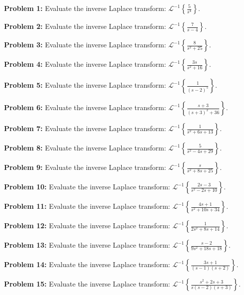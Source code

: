 \documentclass[11pt, letterpaper]{article}
\theoremstyle{definition}
\theoremstyle{remark}
\begin{document}
\textbf{Problem 1:} Evaluate the inverse Laplace transform: $\displaystyle \mathcal{L}^{-1} \left\{ \frac{5}{s^4} \right\}$.

\textbf{Problem 2:} Evaluate the inverse Laplace transform: $\displaystyle \mathcal{L}^{-1} \left\{ \frac{7}{s-4} \right\}$.

\textbf{Problem 3:} Evaluate the inverse Laplace transform: $\displaystyle \mathcal{L}^{-1} \left\{ \frac{8}{s^2 + 25} \right\}$.

\textbf{Problem 4:} Evaluate the inverse Laplace transform: $\displaystyle \mathcal{L}^{-1} \left\{ \frac{3s}{s^2 + 16} \right\}$.

\textbf{Problem 5:} Evaluate the inverse Laplace transform: $\displaystyle \mathcal{L}^{-1} \left\{ \frac{1}{(s-2)^5} \right\}$.

\textbf{Problem 6:} Evaluate the inverse Laplace transform: $\displaystyle \mathcal{L}^{-1} \left\{ \frac{s+3}{(s+3)^2 + 36} \right\}$.

\textbf{Problem 7:} Evaluate the inverse Laplace transform: $\displaystyle \mathcal{L}^{-1} \left\{ \frac{1}{s^2 + 6s + 13} \right\}$.

\textbf{Problem 8:} Evaluate the inverse Laplace transform: $\displaystyle \mathcal{L}^{-1} \left\{ \frac{5}{s^2 - 4s + 29} \right\}$.

\textbf{Problem 9:} Evaluate the inverse Laplace transform: $\displaystyle \mathcal{L}^{-1} \left\{ \frac{s}{s^2 + 8s + 25} \right\}$.

\textbf{Problem 10:} Evaluate the inverse Laplace transform: $\displaystyle \mathcal{L}^{-1} \left\{ \frac{2s - 3}{s^2 - 2s + 10} \right\}$.

\textbf{Problem 11:} Evaluate the inverse Laplace transform: $\displaystyle \mathcal{L}^{-1} \left\{ \frac{4s + 1}{s^2 + 10s + 34} \right\}$.

\textbf{Problem 12:} Evaluate the inverse Laplace transform: $\displaystyle \mathcal{L}^{-1} \left\{ \frac{1}{2s^2 + 8s + 14} \right\}$.

\textbf{Problem 13:} Evaluate the inverse Laplace transform: $\displaystyle \mathcal{L}^{-1} \left\{ \frac{s - 2}{9s^2 + 18s + 18} \right\}$.

\textbf{Problem 14:} Evaluate the inverse Laplace transform: $\displaystyle \mathcal{L}^{-1} \left\{ \frac{3s + 1}{(s-1)(s+2)} \right\}$.

\textbf{Problem 15:} Evaluate the inverse Laplace transform: $\displaystyle \mathcal{L}^{-1} \left\{ \frac{s^2 + 2s + 3}{s(s-2)(s+3)} \right\}$.
\end{document}
